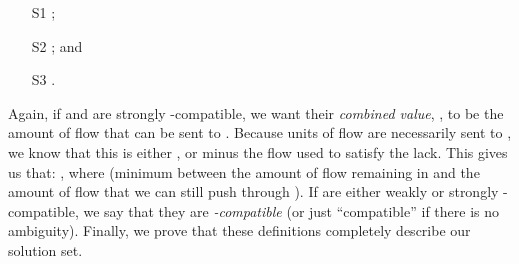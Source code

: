 \documentclass{llncs}
\begin{document}
\begin{itemize}
\item[S1] ;
  \item[S2] ; and \item[S3] . \end{itemize}

Again, if  and  are strongly -compatible, we want their \emph{combined value}, , to be the amount of flow that can be sent to . Because  units of flow are necessarily sent to , we know that this is either , or  minus the flow used to satisfy the lack. This gives us that: , where  (minimum between the amount of flow remaining in  and the amount of flow that we can still push through ). If  are either weakly or strongly -compatible, we say that they are \emph{-compatible} (or just ``compatible'' if there is no ambiguity). Finally, we prove that these definitions completely describe our solution set.
\end{document}
